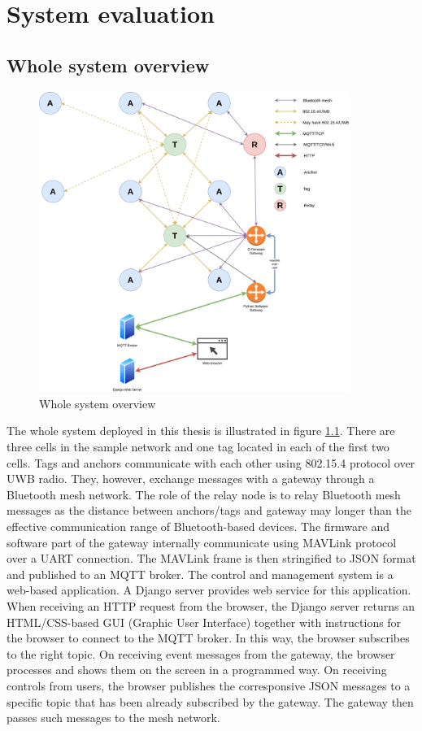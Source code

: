 \documentclass[\main/main.tex]{subfiles}
\begin{document}
\graphicspath{{img/}{06_result/img/}}

\chapter{System evaluation}

\section{Whole system overview}
\begin{figure}[H]
    \centering
    \includegraphics[width=0.9\textwidth]{system_overview.png}
    \caption{Whole system overview}
    \label{fig:system_overview}
\end{figure}
The whole system deployed in this thesis is illustrated in figure \ref{fig:system_overview}. There are three cells in the sample network and one tag located in each of the first two cells. Tags and anchors communicate with each other using 802.15.4 protocol over UWB radio. They, however, exchange messages with a gateway through a Bluetooth mesh network. The role of the relay node is to relay Bluetooth mesh messages as the distance between anchors/tags and gateway may longer than the effective communication range of Bluetooth-based devices. The firmware and software part of the gateway internally communicate using MAVLink protocol over a UART connection. The MAVLink frame is then stringified to JSON format and published to an MQTT broker. The control and management system is a web-based application. A Django server provides web service for this application. When receiving an HTTP request from the browser, the Django server returns an HTML/CSS-based GUI (Graphic User Interface) together with instructions for the browser to connect to the MQTT broker. In this way, the browser subscribes to the right topic. On receiving event messages from the gateway, the browser processes and shows them on the screen in a programmed way. On receiving controls from users, the browser publishes the corresponsive JSON messages to a specific topic that has been already subscribed by the gateway. The gateway then passes such messages to the mesh network.
\end{document}
